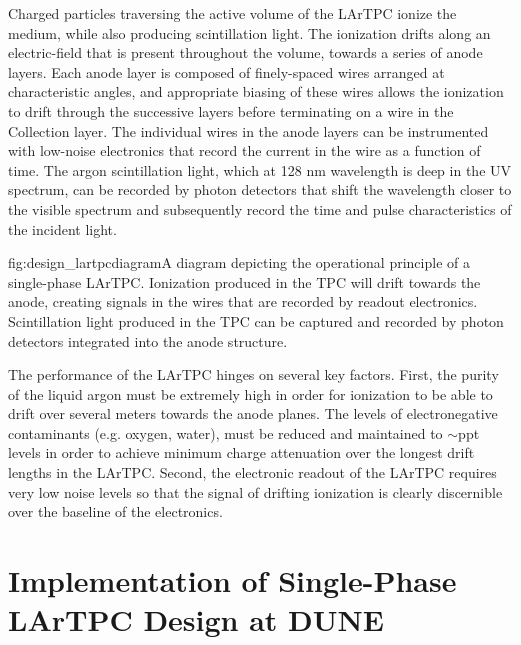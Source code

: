 Charged particles traversing the active volume of the LArTPC ionize the medium,
while also producing scintillation light.  The ionization drifts along
an electric-field that is present throughout the volume, towards a series of
anode layers.  Each anode layer is composed of finely-spaced wires arranged at
characteristic angles, and appropriate biasing of these wires allows the
ionization to drift through the successive layers before terminating on a wire
in the Collection layer.  The individual wires in the anode layers can be
instrumented with low-noise electronics that record the current in the wire as
a function of time.  The argon scintillation light, which at 128 nm wavelength
is deep in the UV spectrum, can be recorded by photon detectors that shift the
wavelength closer to the visible spectrum and subsequently record the time and
pulse characteristics of the incident light.

\begin{dunefigure}{fig:design_lartpcdiagram}{A diagram depicting the operational
    principle of a single-phase LArTPC.  Ionization produced in the TPC will
    drift towards the anode, creating signals in the wires that are recorded
    by readout electronics.  Scintillation light produced in the TPC can be
    captured and recorded by photon detectors integrated into the anode
    structure.}
\end{dunefigure}


The performance of the LArTPC hinges on several key factors.  First, the
purity of the liquid argon must be extremely high in order for ionization to
be able to drift over several meters towards the anode planes.  The levels of
electronegative contaminants (e.g. oxygen, water), must be reduced and
maintained to $\sim$ppt levels in order to achieve minimum charge attenuation
over the longest drift lengths in the LArTPC.   Second, the electronic readout
of the LArTPC requires very low noise levels so that the signal of drifting
ionization is clearly discernible over the baseline of the electronics.  

\section{Implementation of Single-Phase LArTPC Design at DUNE}
\label{sec:fdsp-design-impl}

